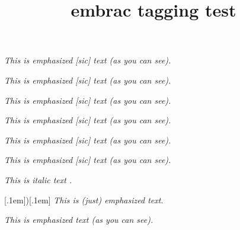 \documentclass{article}
\title{embrac tagging test}
\begin{document}
\emph{This is emphasized [sic] text (as you can see).}

\emph*{This is emphasized [sic] text (as you can see).}

\textit{This is emphasized [sic] text (as you can see).}

\textit*{This is emphasized [sic] text (as you can see).}

\textsl{This is emphasized [sic] text (as you can see).}

\textsl*{This is emphasized [sic] text (as you can see).}

{\itshape This is italic  text .}

\ChangeEmph{(}[.1em]{)}[.1em]
\emph{This is (just) emphasized text.} \par %
\emph{This is emphasized text (as you can see).} %
\end{document}

